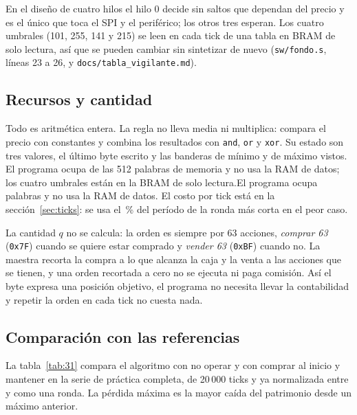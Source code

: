 \documentclass[11pt,a4paper]{article}
\newcommand{\arch}[1]{\texttt{#1}}
\begin{document}
\ifpeldanofondo
En el diseño de cuatro hilos el hilo 0 decide sin saltos que dependan del precio y es el único que toca el SPI y el periférico; los otros tres esperan. Los cuatro umbrales (101, 255, 141 y 215) se leen en cada tick de una tabla en BRAM de solo lectura, así que se pueden cambiar sin sintetizar de nuevo (\arch{sw/fondo.s}, líneas 23 a 26, y \arch{docs/tabla\_vigilante.md}).
\fi

\subsection{Recursos y cantidad}

Todo es aritmética entera. La regla no lleva media ni multiplica: compara el precio con constantes y combina los resultados con \texttt{and}, \texttt{or} y \texttt{xor}. Su estado son tres valores, el último byte escrito y las banderas de mínimo y de máximo vistos. \ifpeldanofondo El programa ocupa \cifraPalabrasPrograma{} de las 512 palabras de memoria y no usa la RAM de datos; los cuatro umbrales están en la BRAM de solo lectura.\else El programa ocupa \cifraPalabrasPrograma{} palabras y no usa la RAM de datos.\fi{} El costo por tick está en la sección~\ref{sec:ticks}: se usa el \cifraUsoRondaTres\,\% del período de la ronda más corta en el peor caso.

La cantidad $q$ no se calcula: la orden es siempre por 63 acciones, \emph{comprar 63} (\texttt{0x7F}) cuando se quiere estar comprado y \emph{vender 63} (\texttt{0xBF}) cuando no. La maestra recorta la compra a lo que alcanza la caja y la venta a las acciones que se tienen, y una orden recortada a cero no se ejecuta ni paga comisión. Así el byte expresa una posición objetivo, el programa no necesita llevar la contabilidad y repetir la orden en cada tick no cuesta nada.

\subsection{Comparación con las referencias}

La tabla~\ref{tab:31} compara el algoritmo con no operar y con comprar al inicio y mantener en la serie de práctica completa, de 20\,000 ticks y ya normalizada entre \cifraPrecioMin{} y \cifraPrecioMax{} como una ronda. La pérdida máxima es la mayor caída del patrimonio desde un máximo anterior.

\begin{table}[H]\centering
\caption{Patrimonio final, órdenes, comisiones y pérdida máxima en la serie de práctica.}\label{tab:31}

\end{table}
\end{document}
